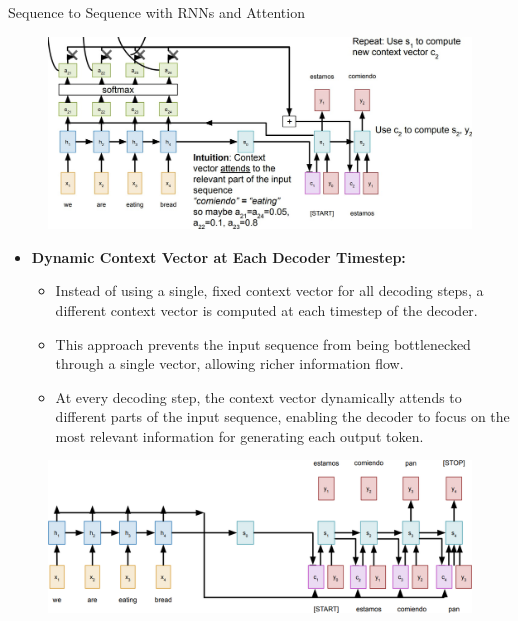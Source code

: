 \begin{frame}[allowframebreaks]{Sequence to Sequence with RNNs and Attention}
    \framebreak

    \begin{figure}
        \centering
        \includegraphics[width=1\textwidth,keepaspectratio]{images/rnn/slide_21_1_img.jpg}
    \end{figure}

    \framebreak
    \begin{itemize}
        \item \textbf{Dynamic Context Vector at Each Decoder Timestep:}
        \begin{itemize}
            \setlength{\itemsep}{-0.5em}
            \item Instead of using a single, fixed context vector for all decoding steps, a different context vector is computed at each timestep of the decoder.
            \item This approach prevents the input sequence from being bottlenecked through a single vector, allowing richer information flow.
            \item At every decoding step, the context vector dynamically attends to different parts of the input sequence, enabling the decoder to focus on the most relevant information for generating each output token.
        \end{itemize}
    \end{itemize}
    \begin{figure}
        \centering
        \includegraphics[width=1\textwidth,keepaspectratio]{images/rnn/slide_22_1_img.png}
    \end{figure}


\end{frame}
